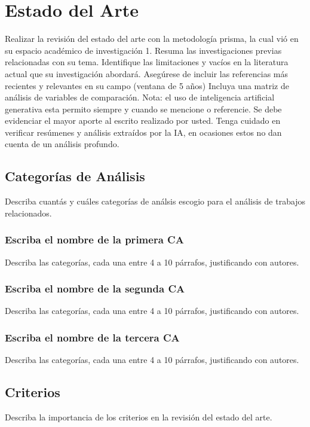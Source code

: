 \chapter{Estado del Arte}

Realizar la revisión del estado del arte con la metodología prisma, la cual vió en su espacio académico de investigación 1.
Resuma las investigaciones previas relacionadas con su tema.
Identifique las limitaciones y vacíos en la literatura actual que su investigación abordará.
Asegúrese de incluir las referencias más recientes y relevantes en su campo (ventana de 5 años)
Incluya una matriz de análisis de variables de comparación.
Nota: el uso de inteligencia artificial generativa esta permito siempre y cuando se mencione o referencie. Se debe evidenciar el mayor aporte al escrito realizado por usted. Tenga cuidado en verificar resúmenes y análisis extraídos por la IA, en ocasiones estos no dan cuenta de un análisis profundo.

\section{Categorías de Análisis}
Describa cuantás y cuáles categorías de análsis escogio para el análisis de trabajos relacionados. 
\\

\subsection{Escriba el nombre de la primera CA}
Describa las categorías, cada una entre 4 a 10 párrafos, justificando con autores.

\subsection{Escriba el nombre de la segunda CA}
Describa las categorías, cada una entre 4 a 10 párrafos, justificando con autores.

\subsection{Escriba el nombre de la tercera CA}
Describa las categorías, cada una entre 4 a 10 párrafos, justificando con autores.

\section{Criterios}
Describa la importancia de los criterios en la revisión del estado del arte.
